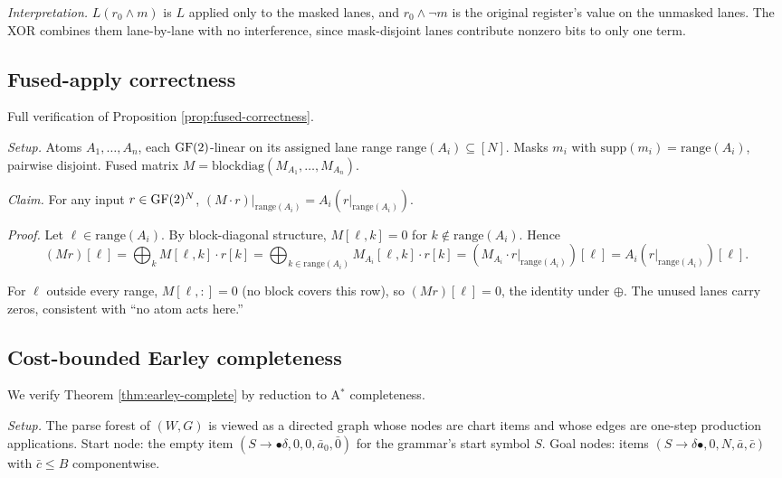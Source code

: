 \emph{Interpretation.} $L(r_0 \wedge m)$ is $L$
applied only to the masked lanes, and $r_0 \wedge
\neg m$ is the original register's value on the
unmasked lanes. The XOR combines them lane-by-lane
with no interference, since mask-disjoint lanes
contribute nonzero bits to only one term.

\subsection{Fused-apply correctness}\label{app:b-fused}

Full verification of Proposition
\ref{prop:fused-correctness}.

\emph{Setup.} Atoms $A_1, \ldots, A_n$, each
$\operatorname{GF}(2)$-linear on its assigned lane range
$\mathrm{range}(A_i) \subseteq [N]$. Masks $m_i$ with
$\mathrm{supp}(m_i) = \mathrm{range}(A_i)$, pairwise
disjoint. Fused matrix $M =
\mathrm{blockdiag}(M_{A_1}, \ldots, M_{A_n})$.

\emph{Claim.} For any input $r \in \operatorname{GF}(2)^N$,
$(M \cdot r)|_{\mathrm{range}(A_i)} =
A_i(r|_{\mathrm{range}(A_i)})$.

\emph{Proof.} Let $\ell \in \mathrm{range}(A_i)$.
By block-diagonal structure, $M[\ell, k] = 0$ for
$k \notin \mathrm{range}(A_i)$. Hence
\begin{equation}
  (M r)[\ell] = \bigoplus_k M[\ell, k] \cdot r[k]
  = \bigoplus_{k \in \mathrm{range}(A_i)}
    M_{A_i}[\ell, k] \cdot r[k]
  = (M_{A_i} \cdot r|_{\mathrm{range}(A_i)})[\ell]
  = A_i(r|_{\mathrm{range}(A_i)})[\ell].
\end{equation}

For $\ell$ outside every range, $M[\ell, :] = 0$
(no block covers this row), so $(M r)[\ell] = 0$,
the identity under $\oplus$. The unused lanes carry
zeros, consistent with ``no atom acts here.''

\subsection{Cost-bounded Earley completeness}\label{app:b-earley}

We verify Theorem \ref{thm:earley-complete} by
reduction to A$^*$ completeness.

\emph{Setup.} The parse forest of $(W, G)$ is viewed
as a directed graph whose nodes are chart items and
whose edges are one-step production applications.
Start node: the empty item
$(S \to \bullet \delta, 0, 0, \bar{a}_0, \bar{0})$
for the grammar's start symbol $S$. Goal nodes:
items $(S \to \delta \bullet, 0, N, \bar{a},
\bar{c})$ with $\bar{c} \leq B$ componentwise.

